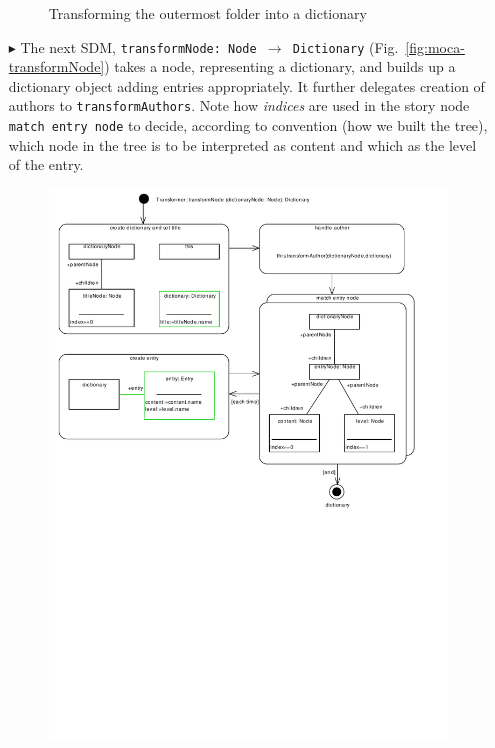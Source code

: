 \begin{enumerate}
\begin{figure}[!htbp]
\begin{center}
  \caption{Transforming the outermost folder into a dictionary}
  \label{fig:moca-transformFolder}
\end{center}
\end{figure}
\item[$\blacktriangleright$] The next SDM, \texttt{transformNode:~Node~$\rightarrow$~Dic\-tion\-ary} (Fig.~\ref{fig:moca-transformNode}) takes a node, representing a dictionary, and builds up a dictionary object adding entries appropriately.
It further delegates creation of authors to \texttt{transformAuthors}.
Note how \emph{indices} are used in the story node \texttt{match entry node} to decide, according to convention (how we built the tree), which node in the tree is to be interpreted as content and which as the level of the entry.
\begin{figure}[!htbp]
\begin{center}
 \includegraphics[width=\textwidth]{pics/moca/3MocaTreeToModel/transformNodePrintPdf}

\end{center}
\end{figure}
\end{enumerate}
